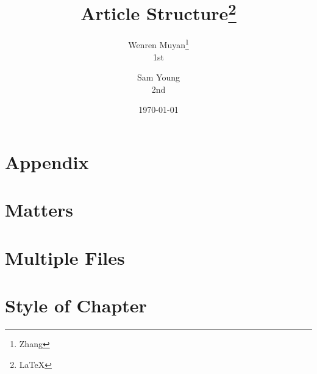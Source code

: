 \documentclass{book}
\title{Article Structure\thanks{LaTeX}}
\author{Wenren Muyan\thanks{Zhang}\\1st  \and Sam Young\\2nd}
\date{\today}
\begin{document}

    \frontmatter
    


    \mainmatter
    \tableofcontents
                                


    \chapter{Appendix}
    \chapter{Matters}

    \chapter{Multiple Files}
        

    \chapter{Style of Chapter}
\end{document}
